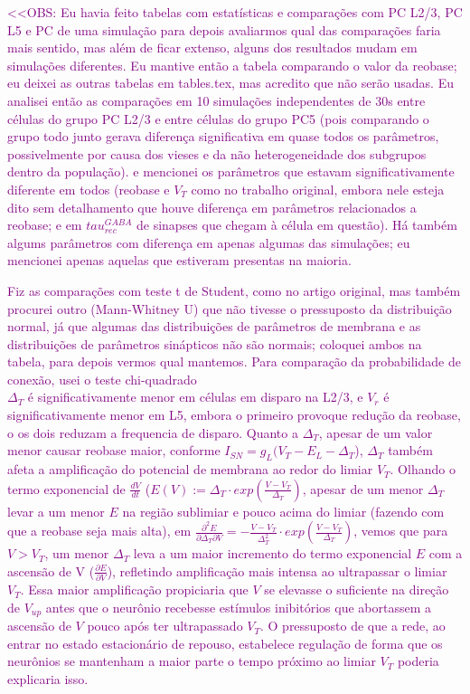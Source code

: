 \textcolor{purple}{
<<OBS: Eu havia feito tabelas com  estatísticas e comparações com PC L2/3, PC L5 e PC de uma simulação para depois avaliarmos qual das comparações faria mais sentido, mas além de ficar extenso, alguns dos resultados mudam em simulações diferentes. Eu mantive então a tabela comparando o valor da reobase; eu deixei as outras tabelas em tables.tex, mas acredito que não serão usadas. Eu analisei então as comparações em 10 simulações independentes de 30s entre células do grupo PC L2/3 e entre células do grupo PC5 (pois comparando o grupo todo junto gerava diferença significativa em quase todos os parâmetros, possivelmente por causa dos vieses e da não heterogeneidade dos subgrupos dentro da população). e mencionei os parâmetros que estavam significativamente diferente em todos (reobase e $V_T$ como no trabalho original, embora nele esteja dito sem detalhamento que houve diferença em parâmetros relacionados a reobase; e em  $tau_{rec}^{GABA}$ de sinapses que chegam à célula em questão). Há também algums parâmetros com diferença em apenas algumas das simulações; eu mencionei apenas aquelas que estiveram presentas na maioria. }

\textcolor{purple}{Fiz as comparações com teste t de Student, como no artigo original, mas também procurei outro (Mann-Whitney U) que não tivesse o pressuposto da distribuição normal, já que algumas das distribuições de parâmetros de membrana e as distribuições de parâmetros sinápticos não são normais; coloquei ambos na tabela, para depois vermos qual mantemos. Para comparação da probabilidade de conexão, usei o teste chi-quadrado}\\
\textcolor{purple}{$\Delta_T$ é significativamente menor em células em disparo na L2/3, e $V_r$ é significativamente menor em L5, embora o primeiro provoque redução da reobase, o os dois reduzam a frequencia de disparo.  Quanto a $\Delta_T$, apesar de um valor menor causar reobase maior, conforme  $I_{SN} = g_L (V_T - E_L - 
\Delta_T$),  $\Delta_T$ também afeta a amplificação do potencial de membrana ao redor do limiar $V_T$. Olhando o termo exponencial de $\frac{dV}{dt}$ ($E(V) := \Delta_T \cdot exp(\frac{V - V_T}{\Delta_T})$, apesar de um menor $\Delta_T$ levar a um menor $E$ na região sublimiar e pouco acima do limiar (fazendo com que a reobase seja mais alta), em $\frac{\partial^2 E}{\partial \Delta_T \partial V} = - \frac{V - V_T}{\Delta_T^2} \cdot exp(\frac{V - V_T}{\Delta_T})$, vemos que para $V > V_T$,   um menor $\Delta_T$ leva a um maior incremento do termo exponencial $E$ com a ascensão de V ($\frac{\partial E}{\partial V}$), refletindo amplificação mais intensa ao ultrapassar o limiar $V_T$. Essa maior amplificação propiciaria que $V$ se elevasse o suficiente na direção de $V_{up}$ antes que o neurônio recebesse estímulos inibitórios que abortassem a ascensão de $V$ pouco após ter ultrapassado $V_T$. O pressuposto de que a rede, ao entrar no estado estacionário de repouso, estabelece regulação de forma que os neurônios se mantenham a maior parte o tempo próximo ao limiar $V_T$ poderia explicaria isso.}\\

